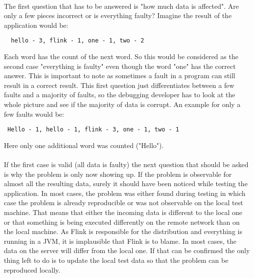 \paragraph{} The first question that has to be answered is
"how much data is affected". Are only a few pieces incorrect or is everything faulty? Imagine the result of the application would be:
\begin{lstlisting}
  hello - 3, flink - 1, one - 1, two - 2
\end{lstlisting}
  Each word has the count of the next word. So this would be considered as the second case "everything is faulty" even though the word "one" has the correct answer. This is important to note as sometimes a fault in a program can still result in a correct result. This first question just differentiates between a few faults and a majority of faults, so the debugging developer has to look at the whole picture and see if the majority of data is corrupt. An example for only a few faults would be:
\begin{lstlisting}
 Hello - 1, hello - 1, flink - 3, one - 1, two - 1
\end{lstlisting}
Here only one additional word was counted ("Hello").
\paragraph{} If the first case is valid (all data is faulty) the next question that should be asked is why the problem is only now showing up. If the problem is observable for almost all the resulting data, surely it should have been noticed while testing the application. In most cases, the problem was either found during testing in which case the problem is already reproducible or was not observable on the local test machine. That means that either the incoming data is different to the local one or that something is being executed differently on the remote network than on the local machine. As Flink is responsible for the distribution and everything is running in a JVM, it is implausible that Flink is to blame. In most cases, the data on the server will differ from the local one. If that can be confirmed the only thing left to do is to update the local test data so that the problem can be reproduced locally.

